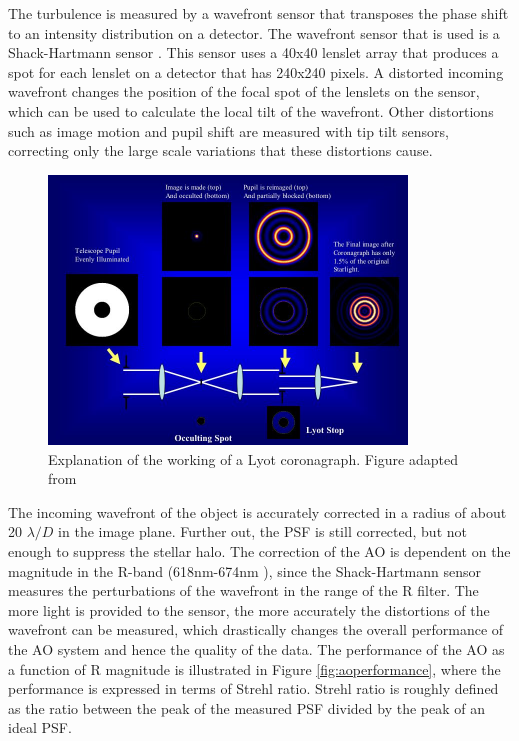 \documentclass[twoside,single,12pt]{lion-msc}
\begin{document}
The turbulence is measured by a wavefront sensor that transposes the phase shift to an intensity distribution on a detector. The wavefront sensor that is used is a Shack-Hartmann sensor \citep{Anugu2013}. This sensor uses a 40x40 lenslet array that produces a spot for each lenslet on a detector that has 240x240 pixels. A distorted incoming wavefront changes the position of the focal spot of the lenslets on the sensor, which can be used to calculate the local tilt of the wavefront. Other distortions such as image motion and pupil shift are measured with tip tilt sensors, correcting only the large scale variations that these distortions cause.
\bigskip

\begin{figure}[!b]
\centering
\includegraphics[trim={0cm 0cm 0cm 0.3cm},clip,width = 0.85\textwidth]{coronagraph}
\caption{Explanation of the working of a Lyot coronagraph. Figure adapted from \citep{Sivaramakrishnan2001}}
\label{fig:coronagraph}
\end{figure}

The incoming wavefront of the object is accurately corrected in a radius of about 20 $\lambda/D$ in the image plane. Further out, the PSF is still corrected, but not enough to suppress the stellar halo. The correction of the AO is dependent on the magnitude in the R-band (618nm-674nm \citep{Mouillet2013}), since the Shack-Hartmann sensor measures the perturbations of the wavefront in the range of the R filter. The more light is provided to the sensor, the more accurately the distortions of the wavefront can be measured, which drastically changes the overall performance of the AO system and hence the quality of the data. The performance of the AO as a function of R magnitude is illustrated in Figure \ref{fig:aoperformance}, where the performance is expressed in terms of Strehl ratio. Strehl ratio is roughly defined as the ratio between the peak of the measured PSF divided by the peak of an ideal PSF.
\end{document}
